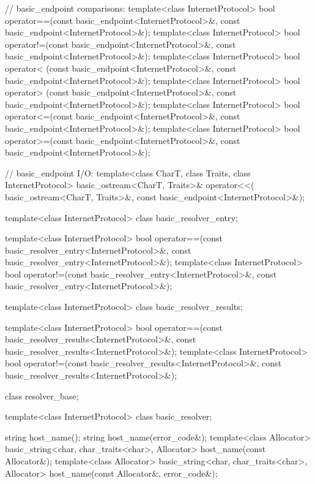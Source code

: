 \begin{codeblock}
{{{{{  // basic_endpoint comparisons:
  template<class InternetProtocol>
    bool operator==(const basic_endpoint<InternetProtocol>&,
                    const basic_endpoint<InternetProtocol>&);
  template<class InternetProtocol>
    bool operator!=(const basic_endpoint<InternetProtocol>&,
                    const basic_endpoint<InternetProtocol>&);
  template<class InternetProtocol>
    bool operator< (const basic_endpoint<InternetProtocol>&,
                    const basic_endpoint<InternetProtocol>&);
  template<class InternetProtocol>
    bool operator> (const basic_endpoint<InternetProtocol>&,
                    const basic_endpoint<InternetProtocol>&);
  template<class InternetProtocol>
    bool operator<=(const basic_endpoint<InternetProtocol>&,
                    const basic_endpoint<InternetProtocol>&);
  template<class InternetProtocol>
    bool operator>=(const basic_endpoint<InternetProtocol>&,
                    const basic_endpoint<InternetProtocol>&);

  // basic_endpoint I/O:
  template<class CharT, class Traits, class InternetProtocol>
    basic_ostream<CharT, Traits>& operator<<(
      basic_ostream<CharT, Traits>&,
      const basic_endpoint<InternetProtocol>&);

  template<class InternetProtocol>
    class basic_resolver_entry;

  template<class InternetProtocol>
    bool operator==(const basic_resolver_entry<InternetProtocol>&,
                    const basic_resolver_entry<InternetProtocol>&);
  template<class InternetProtocol>
    bool operator!=(const basic_resolver_entry<InternetProtocol>&,
                    const basic_resolver_entry<InternetProtocol>&);

  template<class InternetProtocol>
    class basic_resolver_results;

  template<class InternetProtocol>
    bool operator==(const basic_resolver_results<InternetProtocol>&,
                    const basic_resolver_results<InternetProtocol>&);
  template<class InternetProtocol>
    bool operator!=(const basic_resolver_results<InternetProtocol>&,
                    const basic_resolver_results<InternetProtocol>&);

  class resolver_base;

  template<class InternetProtocol>
    class basic_resolver;

  string host_name();
  string host_name(error_code&);
  template<class Allocator>
    basic_string<char, char_traits<char>, Allocator>
      host_name(const Allocator&);
  template<class Allocator>
    basic_string<char, char_traits<char>, Allocator>
      host_name(const Allocator&, error_code&);

}}}}}
\end{codeblock}
